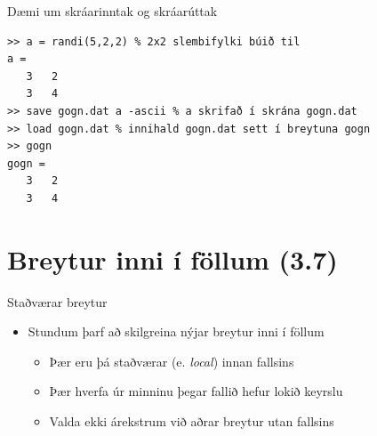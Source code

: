 \documentclass{beamer}
\begin{document}
\begin{frame}[fragile]{Dæmi um skráarinntak og skráarúttak}
\begin{verbatim}
>> a = randi(5,2,2) % 2x2 slembifylki búið til
a =
   3   2
   3   4
>> save gogn.dat a -ascii % a skrifað í skrána gogn.dat
>> load gogn.dat % innihald gogn.dat sett í breytuna gogn
>> gogn
gogn =
   3   2
   3   4
\end{verbatim}
\end{frame}

\section{Breytur inni í föllum (3.7)}

\begin{frame}{Staðværar breytur}
\begin{itemize}
 \item Stundum þarf að skilgreina nýjar breytur inni í föllum
 \begin{itemize}
  \item Þær eru þá staðværar (e. \emph{local}) innan fallsins
  \item Þær hverfa úr minninu þegar fallið hefur lokið keyrslu
  \item Valda ekki árekstrum við aðrar breytur utan fallsins
 \end{itemize}
\end{itemize}
\end{frame}
\end{document}
